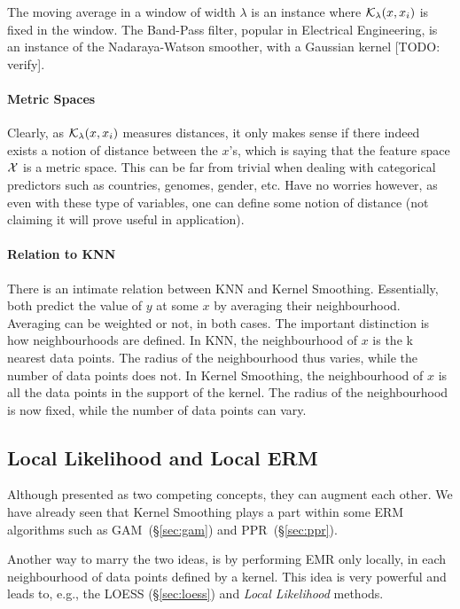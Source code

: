 The moving average in a window of width $\lambda$ is an instance where $\mathcal{K}_\lambda(x,x_i)$ is fixed in the window.
The Band-Pass filter, popular in Electrical Engineering, is an instance of the Nadaraya-Watson smoother, with a Gaussian kernel [TODO: verify].


\paragraph{Metric Spaces}
Clearly, as $\mathcal{K}_\lambda(x,x_i)$ measures distances, it only makes sense if there indeed exists a notion of distance between the $x$'s, which is saying that the feature space $\mathcal{X}$ is a metric space. 
This can be far from trivial when dealing with categorical predictors such as countries, genomes, gender, etc.
Have no worries however, as even with these type of variables, one can define some notion of distance (not claiming it will prove useful in application).


\paragraph{Relation to KNN}
There is an intimate relation between KNN and Kernel Smoothing. 
Essentially, both predict the value of $y$ at some $x$ by averaging their neighbourhood. 
Averaging can be weighted or not, in both cases.
The important distinction is how neighbourhoods are defined.
In KNN, the neighbourhood of $x$ is the k nearest data points. The radius of the neighbourhood thus varies, while the number of data points does not.
In Kernel Smoothing, the neighbourhood of $x$ is all the data points in the support of the kernel. The radius of the neighbourhood is now fixed, while the number of data points can vary.




\subsection{Local Likelihood and Local ERM}
Although presented as two competing concepts, they can augment each other. 
We have already seen that Kernel Smoothing plays a part within some ERM algorithms such as GAM~(\S\ref{sec:gam}) and PPR~(\S \ref{sec:ppr}).

Another way to marry the two ideas, is by performing EMR only locally, in each neighbourhood of data points defined by a kernel. This idea is very powerful and leads to, e.g., the LOESS (\S \ref{sec:loess}) and \emph{Local Likelihood} methods.



